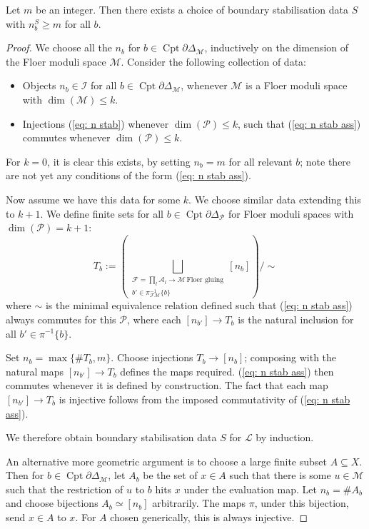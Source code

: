 \documentclass{TPmod}
\newcommand{\Cptd}{\operatorname{Cpt}\partial}
\newcommand{\cA}{\mathcal{A}}
\newcommand{\cF}{\mathcal{F}}
\newcommand{\cI}{\mathcal{I}}
\newcommand{\cL}{\mathcal{L}}
\newcommand{\cM}{\mathcal{M}}
\newcommand{\cP}{\mathcal{P}}
\renewcommand{\cong}{\simeq}
\numberwithin{equation}{section}
\begin{document}
    \begin{lem}\label{lem: ex big S}
        Let $m$ be an integer. Then there exists a choice of boundary stabilisation data $S$ with $n^S_b \geq m$ for all $b$.
    \end{lem}
    \begin{proof}
        We choose all the $n_b$ for $b \in \Cptd\Delta_\cM$, inductively on the dimension of the Floer moduli space $\cM$. Consider the following collection of data:
        \begin{itemize}
            \item Objects $n_b \in \cI$ for all $b \in \Cptd\Delta_\cM$, whenever $\cM$ is a Floer moduli space with $\dim(\cM) \leq k$.
            \item Injections (\ref{eq: n stab}) whenever $\dim(\cP) \leq k$, such that (\ref{eq: n stab ass}) commutes whenever $\dim(\cP) \leq k$.
        \end{itemize}
        For $k=0$, it is clear this exists, by setting $n_b=m$ for all relevant $b$; note there are not yet any conditions of the form (\ref{eq: n stab ass}).

        Now assume we have this data for some $k$. We choose similar data extending this to $k+1$. We define finite sets for all $b \in \Cptd\Delta_\cP$ for Floer moduli spaces with $\dim(\cP) = k+1$:
        \begin{equation}
            T_b := \left(\bigsqcup\limits_{\substack{\cF=\prod_l\cA_l \to \cM \,\textrm{Floer gluing}
            \\
            b' \in \pi_{\cF\cM}^{-1}\{b\}}} [n_b] \right)/\sim
        \end{equation}
        where $\sim$ is the minimal equivalence relation defined such that (\ref{eq: n stab ass}) always commutes for this $\cP$, where each $[n_{b'}] \to T_b$ is the natural inclusion for all $b' \in \pi^{-1}\{b\}$.
        
        Set $n_b = \max\{\#T_b,m\}$. Choose injections $T_b \to [n_b]$; composing with the natural maps $[n_{b'}] \to T_b$ defines the maps required. (\ref{eq: n stab ass}) then commutes whenever it is defined by construction. The fact that each map $[n_{b'}] \to T_b$ is injective follows from the imposed commutativity of (\ref{eq: n stab ass}).

        We therefore obtain boundary stabilisation data $S$ for $\cL$ by induction.

        An alternative more geometric argument is to choose a large finite subset $A \subseteq X$. Then for $b \in \Cptd\Delta_\cM$, let $A_b$ be the set of $x \in A$ such that there is some $u \in \cM$ such that the restriction of $u$ to $b$ hits $x$ under the evaluation map. Let $n_b = \#A_b$ and choose bijections $A_b \cong [n_b]$ arbitrarily. The maps $\pi$, under this bijection, send $x \in A$ to $x$. For $A$ chosen generically, this is always injective.
    \end{proof}
\end{document}
